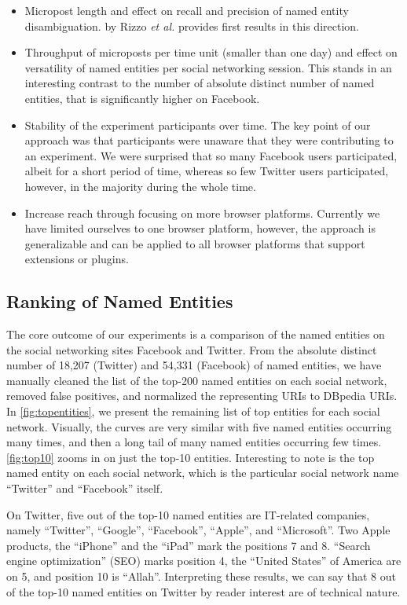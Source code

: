 \documentclass{iosart2c}
\begin{document}
\begin{itemize}
\item Micropost length and effect on recall and precision of named entity disambiguation.
\cite{nerd} by Rizzo \textit{et al.} provides first results in this direction.
\item Throughput of microposts per time unit (smaller than one day) and effect on versatility of named entities per social networking session.
This stands in an interesting contrast to the number of absolute distinct number of named entities, that is significantly higher on Facebook.
\item Stability of the experiment participants over time.
The key point of our approach was that participants were unaware that they were contributing to an experiment.
We were surprised that so many Facebook users participated, albeit for a short period of time, whereas so few Twitter users participated, however, in the majority during the whole time.
\item Increase reach through focusing on more browser platforms.
Currently we have limited ourselves to one browser platform, however, the approach is generalizable and can be applied to all browser platforms that support extensions or plugins.
\end{itemize}

\subsection{Ranking of Named Entities}
The core outcome of our experiments is a comparison of the named entities on the social networking sites Facebook and Twitter.
From the absolute distinct number of 18,207 (Twitter) and 54,331 (Facebook) of named entities, we have manually cleaned the list of the top-200 named entities on each social network, removed false positives, and normalized the representing URIs to DBpedia URIs.
In \autoref{fig:topentities}, we present the remaining list of top entities for each social network.
Visually, the curves are very similar with five named entities occurring many times, and then a long tail of many named entities occurring few times.
\autoref{fig:top10} zooms in on just the top-10 entities.
Interesting to note is the top named entity on each social network, which is the particular social network name ``Twitter'' and ``Facebook'' itself. 

On Twitter, five out of the top-10 named entities are IT-related companies, namely ``Twitter'', ``Google'', ``Facebook'', ``Apple'', and ``Microsoft''.
Two Apple products, the ``iPhone'' and the ``iPad'' mark the positions 7 and 8.
``Search engine optimization'' (SEO) marks position 4, the ``United States'' of America are on 5, and position 10 is ``Allah''.
Interpreting these results, we can say that 8 out of the top-10 named entities on Twitter by reader interest are of technical nature.
\end{document}

